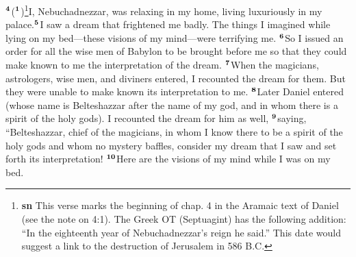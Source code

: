 \documentclass[12pt,a4paper,final]{article}
\renewcommand{\textsuperscript}[1]{\ensuremath{^{\textbf{\scriptsize #1}}}}
\begin{document}
\textsuperscript{4}(\textsuperscript{1})\footnote{\textbf{sn} This verse marks the beginning of chap. 4 in the Aramaic text of Daniel (see the note on 4:1). The Greek OT (Septuagint) has the following addition: “In the eighteenth year of Nebuchadnezzar’s reign he said.” This date would suggest a link to the destruction of Jerusalem in 586 B.C.}I, Nebuchadnezzar, was relaxing in my home, living luxuriously in my palace.\textsuperscript{5}I saw a dream that frightened me badly. The things I imagined while lying on my bed—these visions of my mind—were terrifying me. \textsuperscript{6}So I issued an order for all the wise men of Babylon to be brought before me so that they could make known to me the interpretation of the dream. \textsuperscript{7}When the magicians, astrologers, wise men, and diviners entered, I recounted the dream for them. But they were unable to make known its interpretation to me. \textsuperscript{8}Later Daniel entered (whose name is Belteshazzar after the name of my god, and in whom there is a spirit of the holy gods). I recounted the dream for him as well, \textsuperscript{9}saying, “Belteshazzar, chief of the magicians, in whom I know there to be a spirit of the holy gods and whom no mystery baffles, consider my dream that I saw and set forth its interpretation! \textsuperscript{10}Here are the visions of my mind while I was on my bed. 
\end{document}
